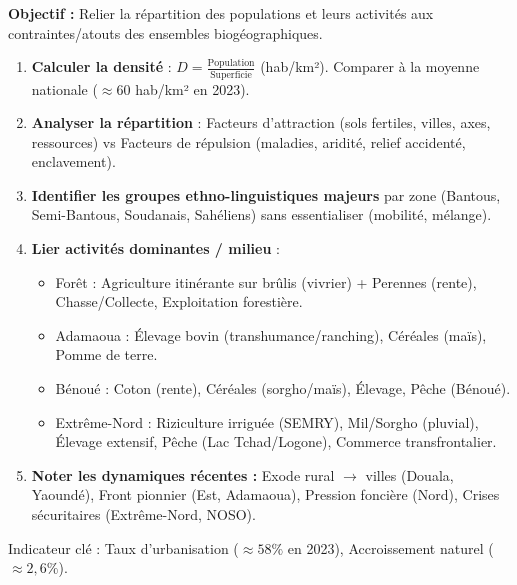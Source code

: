 \documentclass[11pt]{article}
\newcommand{\cle}[1]{{\popxbold\color{popdark}#1}}
\begin{document}
\begin{methode}
\textbf{Objectif :} Relier la répartition des populations et leurs activités aux contraintes/atouts des ensembles biogéographiques.
\begin{enumerate}
    \item \textbf{Calculer la densité} : $D = \frac{\text{Population}}{\text{Superficie}}$ (hab/km²). Comparer à la moyenne nationale ($\approx 60$ hab/km² en 2023).
    \item \textbf{Analyser la répartition} : Facteurs d'attraction (sols fertiles, villes, axes, ressources) vs Facteurs de répulsion (maladies, aridité, relief accidenté, enclavement).
    \item \textbf{Identifier les groupes ethno-linguistiques majeurs} par zone (Bantous, Semi-Bantous, Soudanais, Sahéliens) sans essentialiser (mobilité, mélange).
    \item \textbf{Lier activités dominantes / milieu} :
    \begin{itemize}
        \item Forêt : Agriculture itinérante sur brûlis (vivrier) + Perennes (rente), Chasse/Collecte, Exploitation forestière.
        \item Adamaoua : Élevage bovin (transhumance/ranching), Céréales (maïs), Pomme de terre.
        \item Bénoué : Coton (rente), Céréales (sorgho/maïs), Élevage, Pêche (Bénoué).
        \item Extrême-Nord : Riziculture irriguée (SEMRY), Mil/Sorgho (pluvial), Élevage extensif, Pêche (Lac Tchad/Logone), Commerce transfrontalier.
    \end{itemize}
    \item \textbf{Noter les dynamiques récentes :} Exode rural $\rightarrow$ villes (Douala, Yaoundé), Front pionnier (Est, Adamaoua), Pression foncière (Nord), Crises sécuritaires (Extrême-Nord, NOSO).
\end{enumerate}
\cle{Indicateur clé} : Taux d'urbanisation ($\approx 58\%$ en 2023), Accroissement naturel ($\approx 2,6\%$).
\end{methode}
\end{document}

